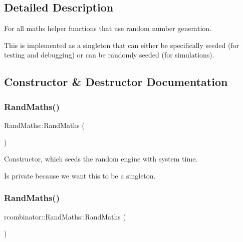 \subsection{Detailed Description}
For all maths helper functions that use random number generation. 

This is implemented as a singleton that can either be specifically seeded (for testing and debugging) or can be randomly seeded (for simulations). 

\subsection{Constructor \& Destructor Documentation}
\mbox{\label{classrcombinator_1_1RandMaths_aa507e7465f9a650d560aa42c7f75310f}} 
\subsubsection{\texorpdfstring{Rand\+Maths()}{RandMaths()}\hspace{0.1cm}{\footnotesize\ttfamily [1/2]}}
{\footnotesize\ttfamily Rand\+Maths\+::\+Rand\+Maths (\begin{DoxyParamCaption}{ }\end{DoxyParamCaption})\hspace{0.3cm}{\ttfamily [private]}}



Constructor, which seeds the random engine with system time. 

Is private because we want this to be a singleton. \mbox{\label{classrcombinator_1_1RandMaths_ac9b350a4aa07b739dcc2bb12c3b5c0e5}} 
\subsubsection{\texorpdfstring{Rand\+Maths()}{RandMaths()}\hspace{0.1cm}{\footnotesize\ttfamily [2/2]}}
{\footnotesize\ttfamily rcombinator\+::\+Rand\+Maths\+::\+Rand\+Maths (\begin{DoxyParamCaption}\item[{\mbox{\hyperlink{classrcombinator_1_1RandMaths}{Rand\+Maths}} const \&}]{ }\end{DoxyParamCaption})\hspace{0.3cm}{\ttfamily [delete]}}



